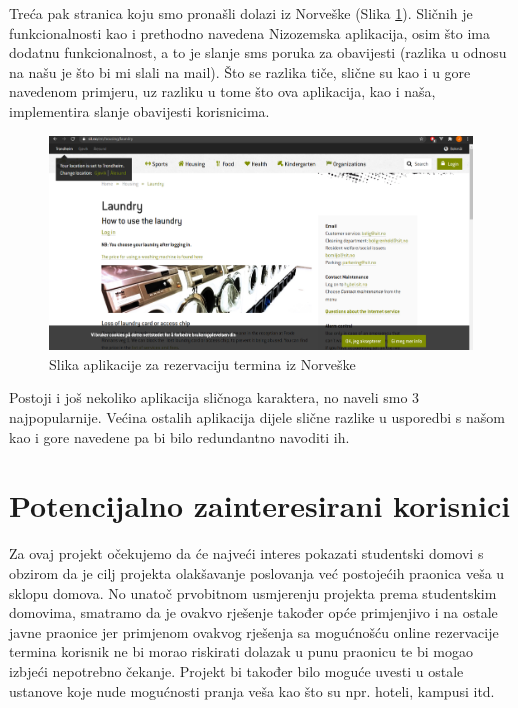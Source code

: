 			{Treća pak stranica koju smo pronašli dolazi iz Norveške (Slika  \ref{fig:sit}). Sličnih je funkcionalnosti kao i prethodno
			navedena Nizozemska aplikacija, osim što ima dodatnu funkcionalnost, a to je slanje sms poruka za
			obavijesti (razlika u odnosu na našu je što bi mi slali na mail). Što se razlika tiče, slične su kao i u gore
			navedenom primjeru, uz razliku u tome što ova aplikacija, kao i naša, implementira slanje obavijesti
			korisnicima. }
		
			\begin{figure}[H]
				\includegraphics[width=.9\linewidth]{slike/SIT.PNG}
				\centering
				\caption{Slika aplikacije za rezervaciju termina iz Norveške}
				\label{fig:sit}
			\end{figure}
		
			{Postoji i još nekoliko aplikacija sličnoga karaktera, no naveli smo 3 najpopularnije. Većina ostalih
			aplikacija dijele slične razlike u usporedbi s našom kao i gore navedene pa bi bilo redundantno navoditi
			ih.}
			
		\section{Potencijalno zainteresirani korisnici}
			
			{Za ovaj projekt očekujemo da će najveći interes pokazati studentski domovi s obzirom da je cilj projekta
			olakšavanje poslovanja već postojećih praonica veša u sklopu domova. No unatoč prvobitnom
			usmjerenju projekta prema studentskim domovima, smatramo da je ovakvo rješenje također opće
			primjenjivo i na ostale javne praonice jer primjenom ovakvog rješenja sa mogućnošću online rezervacije
			termina korisnik ne bi morao riskirati dolazak u punu praonicu te bi mogao izbjeći nepotrebno čekanje.
			Projekt bi također bilo moguće uvesti u ostale ustanove koje nude mogućnosti pranja veša kao što su
			npr. hoteli, kampusi itd.}	
		
